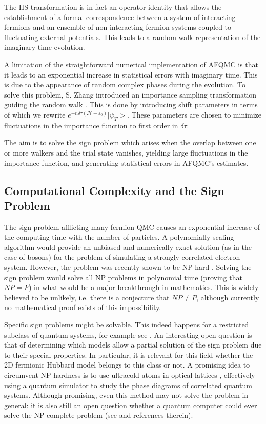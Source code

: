 \documentclass[10pt, twocolumn, twoside]{article}
\begin{document}
The HS transformation is in fact an operator identity that allows the establishment of a formal correspondence between a system of interacting fermions and an ensemble of non interacting fermion systems coupled to fluctuating external potentials. This leads to a random walk representation of the imaginary time evolution.\par

A limitation of the straightforward numerical implementation of AFQMC is that it leads to an exponential increase in statistical errors with imaginary time. This is due to the appearance of random complex phases during the evolution. To solve this problem, S. Zhang introduced an importance sampling transformation guiding the random walk \cite{zphase}  . This is done by introducing shift parameters in terms of which we rewrite $e^{-n\delta \tau (\mathcal{H} - \varepsilon_0)} |\psi_T >$. These parameters are chosen to minimize fluctuations in the importance function to first order in $\delta \tau$.\par

The aim is to solve the sign problem which arises when the overlap between one or more walkers and the trial state vanishes, yielding large fluctuations in the importance function, and generating statistical errors in AFQMC's estimates.

\subsection{Computational Complexity and the Sign Problem}

The sign problem afflicting many-fermion QMC causes an exponential increase of the computing time with the number of particles. A polynomially scaling algorithm would provide an unbiased and numerically exact solution (as in the case of bosons) for the problem of simulating a strongly correlated electron system. However, the problem was recently shown to be NP hard \cite{troyer}. Solving the sign problem would solve all NP problems in polynomial time (proving that $NP = P$) in what would be a major breakthrough in mathematics. This is widely believed to be unlikely, i.e. there is a conjecture that $NP \neq P$, although currently no mathematical proof exists of this impossibility.\par

Specific sign problems might be solvable. This indeed happens for a restricted subclass of quantum systems, for example see \cite{wiese, arnow,kalos}. An interesting open question is that of determining which models allow a partial solution of the sign problem due to their special properties. In particular, it is relevant for this field whether the 2D fermionic Hubbard model belongs to this class or not. A promising idea to circumvent NP hardness is to use ultracold atoms in optical lattices \cite{optical}, effectively using a quantum simulator to study the phase diagrams of correlated quantum systems. Although promising, even this method may not solve the problem in general: it is also still an open question whether a quantum computer could ever solve the NP complete problem (see \cite{troyer} and references therein).
\end{document}
